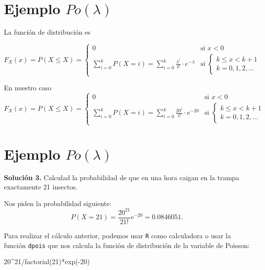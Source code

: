 \documentclass[
  letterpaper,
  DIV=11,
  numbers=noendperiod]{scrreprt}
\newenvironment{Shaded}{\begin{snugshade}}{\end{snugshade}}
\newcommand{\DecValTok}[1]{\textcolor[rgb]{0.68,0.00,0.00}{#1}}
\newcommand{\FunctionTok}[1]{\textcolor[rgb]{0.28,0.35,0.67}{#1}}
\newcommand{\NormalTok}[1]{\textcolor[rgb]{0.00,0.23,0.31}{#1}}
\newcommand{\SpecialCharTok}[1]{\textcolor[rgb]{0.37,0.37,0.37}{#1}}
\begin{document}
\section{\texorpdfstring{Ejemplo
\(Po(\lambda)\)}{Ejemplo Po(\textbackslash lambda)}}\label{ejemplo-polambda-3}

La función de distribución es

\[
F_X(x)=P(X\leq X)=
\left\{\begin{array}{ll} 
0 & \mbox{si } x<0\\
\displaystyle\sum_{i=0}^{k} P(X=i)=\sum_{i=0}^{k}\frac{\lambda^i}{i!}\cdot e^{-\lambda} & \mbox{si  }
\left\{\begin{array}{l}
k\leq x< k+1\\k=0,1,2,\ldots
\end{array}
\right.
\end{array}
\right.
\]

En nuestro caso \[
F_X(x)=P(X\leq X)=
\left\{\begin{array}{ll} 
0 & \mbox{si } x<0\\
\displaystyle\sum_{i=0}^{k} P(X=i)=\sum_{i=0}^{k}\frac{20^i}{i!}\cdot e^{-20} & \mbox{si  }
\left\{\begin{array}{l}
k\leq x< k+1\\k=0,1,2,\ldots
\end{array}
\right.
\end{array}
\right.
\]

\section{\texorpdfstring{Ejemplo
\(Po(\lambda)\)}{Ejemplo Po(\textbackslash lambda)}}\label{ejemplo-polambda-4}

\textbf{Solución 3.} Calculad la probabilidad de que en una hora caigan
en la trampa exactamente 21 insectos.

Nos piden la probabilidad siguiente: \[
P(X=21)=\frac{20^{21}}{21!} e^{-20}=0.0846051.
\]

Para realizar el cálculo anterior, podemos usar \texttt{R} como
calculadora o usar la función \texttt{dpois} que nos calcula la función
de distribución de la variable de Poisson:

\begin{Shaded}
\begin{Highlighting}[]
\DecValTok{20}\SpecialCharTok{\^{}}\DecValTok{21}\SpecialCharTok{/}\FunctionTok{factorial}\NormalTok{(}\DecValTok{21}\NormalTok{)}\SpecialCharTok{*}\FunctionTok{exp}\NormalTok{(}\SpecialCharTok{{-}}\DecValTok{20}\NormalTok{)}
\end{Highlighting}
\end{Shaded}
\end{document}
